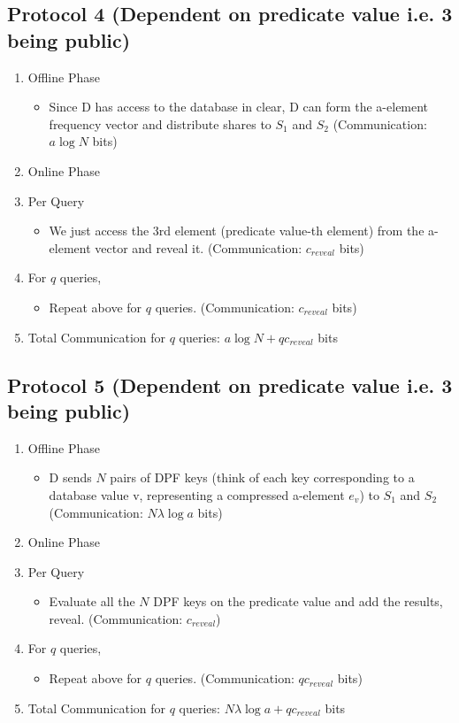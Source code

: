 \subsection{Protocol 4 (Dependent on predicate value i.e. 3 being public)}
\begin{enumerate}
    \item Offline Phase
    \begin{itemize}
        \item Since D has access to the database in clear, D can form the a-element frequency vector and distribute shares to $S_1$ and $S_2$ (Communication: $a\log N$ bits)
    \end{itemize}
    \item Online Phase
    \item Per Query
    \begin{itemize}
        \item We just access the 3rd element (predicate value-th element) from the a-element vector and reveal it. (Communication: $c_{reveal}$ bits) 
    \end{itemize}
    \item For $q$ queries,
    \begin{itemize}
        \item Repeat above for $q$ queries. (Communication: $c_{reveal}$ bits)
    \end{itemize}
    \item Total Communication for $q$ queries: $a\log N + qc_{reveal}$ bits  
\end{enumerate}

\subsection{Protocol 5 (Dependent on predicate value i.e. 3 being public)}
\begin{enumerate}
    \item Offline Phase
    \begin{itemize}
        \item D sends $N$ pairs of DPF keys (think of each key corresponding to a database value v, representing a compressed a-element $e_v$) to $S_1$ and $S_2$ (Communication: $N\lambda\log a$ bits)
    \end{itemize}
    \item Online Phase
    \item Per Query
    \begin{itemize}
        \item Evaluate all the $N$ DPF keys on the predicate value and add the results, reveal. (Communication: $c_{reveal}$)
    \end{itemize}
    \item For $q$ queries,
    \begin{itemize}
        \item Repeat above for $q$ queries. (Communication: $qc_{reveal}$ bits)
    \end{itemize}
    \item Total Communication for $q$ queries: $N\lambda\log a + qc_{reveal}$ bits  
\end{enumerate}

